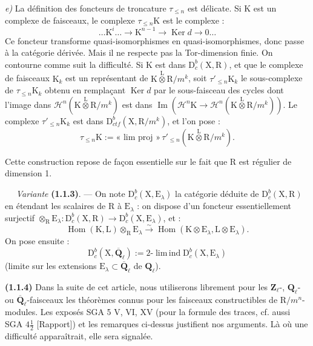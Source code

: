 \documentclass[11pt,leqno]{article}
\newcommand{\Page}[1]{\ifvmode\noindent\else\unskip\ \fi{\footnotesize\textcolor{gray}{[p.\,#1]}}\ \ignorespaces}
\begin{document}
\textit{e)} La définition des foncteurs de troncature \(\tau_{\leq n}\) est délicate. Si \(\mathrm{K}\) est un complexe de faisceaux, le complexe \(\tau_{\leq n}\mathrm{K}\) est le complexe :
\[
\ldots\mathrm{K}^i\ldots\to\mathrm{K}^{n-1}\to\operatorname{Ker}d\to0\ldots
\]
Ce foncteur transforme quasi-isomorphismes en quasi-isomorphismes, donc passe à la catégorie dérivée. Mais il ne respecte pas la Tor-dimension finie. On contourne comme suit la difficulté. Si \(\mathrm{K}\) est dans \(\mathrm{D}_c^b(\mathrm{X},\mathrm{R})\), et que le complexe de faisceaux \(\mathrm{K}_k\) est un représentant de \(\mathrm{K}\overset{\mathrm{L}}{\otimes}\mathrm{R}/m^k\), soit \(\tau'_{\leq n}\mathrm{K}_k\) le sous-complexe de \(\tau_{\leq n}\mathrm{K}_k\) obtenu en remplaçant \(\operatorname{Ker}d\) par le sous-faisceau des cycles dont l’image dans \(\mathscr{H}^n(\mathrm{K}\overset{\mathrm{L}}{\otimes}\mathrm{R}/m^k)\) est dans \(\operatorname{Im}(\mathscr{H}^n\mathrm{K}\to\mathscr{H}^n(\mathrm{K}\overset{\mathrm{L}}{\otimes}\mathrm{R}/m^k))\). Le complexe \(\tau'_{\leq n}\mathrm{K}_k\) est dans \(\mathrm{D}_{\mathit{ctf}}^b(\mathrm{X},\mathrm{R}/m^k)\), et l’on pose :
\[
\tau_{\leq n}\mathrm{K}
:=\text{« lim proj »}\,\tau'_{\leq n}(\mathrm{K}\overset{\mathrm{L}}{\otimes}\mathrm{R}/m^k).
\]

Cette construction repose de façon essentielle sur le fait que \(\mathrm{R}\) est régulier de dimension 1.

\Page{150}
\textit{Variante} \textbf{(1.1.3)}. — On note \(\mathrm{D}_c^b(\mathrm{X},\mathrm{E}_\lambda)\) la catégorie déduite de \(\mathrm{D}_c^b(\mathrm{X},\mathrm{R})\) en étendant les scalaires de \(\mathrm{R}\) à \(\mathrm{E}_\lambda\) : on dispose d’un foncteur essentiellement surjectif \(\otimes_{\mathrm{R}}\mathrm{E}_\lambda:\mathrm{D}_c^b(\mathrm{X},\mathrm{R})\to\mathrm{D}_c^b(\mathrm{X},\mathrm{E}_\lambda)\), et :
\[
\operatorname{Hom}(\mathrm{K},\mathrm{L})\otimes_{\mathrm{R}}\mathrm{E}_\lambda
\overset{\sim}{\to}
\operatorname{Hom}(\mathrm{K}\otimes\mathrm{E}_\lambda,\mathrm{L}\otimes\mathrm{E}_\lambda).
\]
On pose ensuite :
\[
\mathrm{D}_c^b(\mathrm{X},\overline{\mathbf{Q}}_\ell)
:=2\text{-}\operatorname{lim\,ind}\mathrm{D}_c^b(\mathrm{X},\mathrm{E}_\lambda)
\]
(limite sur les extensions \(\mathrm{E}_\lambda\subset\overline{\mathbf{Q}}_\ell\) de \(\mathbf{Q}_\ell\)).

\textbf{(1.1.4)} Dans la suite de cet article, nous utiliserons librement pour les \(\mathbf{Z}_\ell\)-, \(\mathbf{Q}_\ell\)- ou \(\overline{\mathbf{Q}}_\ell\)-faisceaux les théorèmes connus pour les faisceaux constructibles de \(\mathrm{R}/m^n\)-modules. Les exposés SGA 5 V, VI, XV (pour la formule des traces, cf. aussi SGA \(4\frac{1}{2}\) [Rapport]) et les remarques ci-dessus justifient nos arguments. Là où une difficulté apparaîtrait, elle sera signalée.
\end{document}
